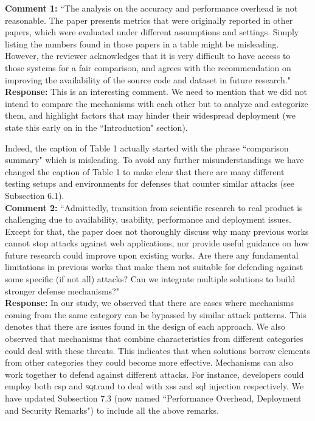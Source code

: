 \documentclass[10pt,journal,compsoc]{IEEEtran}
\begin{document}
{\bf Comment 1:} ``The analysis on the accuracy
and performance overhead is not reasonable.
The paper presents metrics that were originally
reported in other papers,
which were evaluated under different
assumptions and settings.
Simply listing the numbers found in those papers
in a table might be misleading.
However,
the reviewer acknowledges that it is very
difficult to have access to those systems for a fair comparison,
and agrees with the recommendation on improving
the availability of the source code and dataset
in future research."\\

\noindent
{\bf Response:}
This is an interesting comment.
We need to mention that we did not intend to
compare the mechanisms with each other
but to analyze and categorize them,
and highlight factors that may hinder
their widespread deployment
(we state this early on in the
``Introduction" section).

Indeed,
the caption of Table 1 actually
started with the phrase ``comparison summary"
which is misleading.
To avoid any further misunderstandings
we have changed the caption of Table 1
to make clear that there
are many different testing setups and
environments for defenses that counter
similar attacks (see Subsection 6.1).\\

\noindent
{\bf Comment 2:} ``Admittedly, transition
from scientific research to real product
is challenging due to availability, usability,
performance and deployment issues.
Except for that, the paper does not thoroughly
discuss why many previous works
cannot stop attacks against web applications,
nor provide useful guidance on
how future research could improve upon existing works.
Are there any fundamental
limitations in previous works that make
them not suitable for defending against
some specific (if not all) attacks?
Can we integrate multiple solutions to build
stronger defense mechanisms?"\\

\noindent
{\bf Response:}
In our study,
we observed that there are cases where
mechanisms coming from the same category
can be bypassed by similar attack patterns.
This denotes that there are issues
found in the design of each approach.
We also observed that mechanisms that
combine characteristics
from different categories
could deal with these threats.
This indicates that when solutions
borrow elements from other categories
they could become more effective.
Mechanisms can also work together
to defend against different attacks.
For instance,
developers could employ both {\sc csp}
and \textsc{sql}rand
to deal with {\sc xss} and
{\sc sql} injection respectively.
We have updated Subsection 7.3
(now named ``Performance Overhead,
Deployment and Security Remarks")
to include all the above remarks.\\
\end{document}
